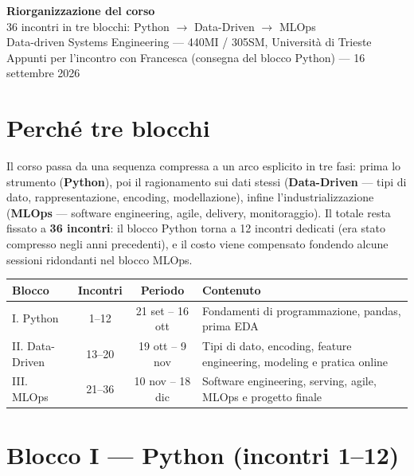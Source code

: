 \documentclass[11pt,a4paper]{article}
\begin{document}
\begin{center}
{\Huge\bfseries\color{courseblue} Riorganizzazione del corso}\\[4pt]
{\Large\color{coursegray} 36 incontri in tre blocchi: Python $\to$ Data-Driven $\to$ MLOps}\\[6pt]
{\small\color{coursegray} Data-driven Systems Engineering --- 440MI / 305SM, Università di Trieste}\\
{\small\color{coursegray} Appunti per l'incontro con Francesca (consegna del blocco Python) --- 16 settembre 2026}
\end{center}

\vspace{0.6em}

\section*{Perché tre blocchi}
Il corso passa da una sequenza compressa a un arco esplicito in tre fasi: prima lo strumento (\textbf{Python}), poi il ragionamento sui dati stessi (\textbf{Data-Driven} --- tipi di dato, rappresentazione, encoding, modellazione), infine l'industrializzazione (\textbf{MLOps} --- software engineering, agile, delivery, monitoraggio). Il totale resta fissato a \textbf{36 incontri}: il blocco Python torna a 12 incontri dedicati (era stato compresso negli anni precedenti), e il costo viene compensato fondendo alcune sessioni ridondanti nel blocco MLOps.

\vspace{0.3em}
\begin{center}
\begin{tabularx}{\textwidth}{@{}l c c X@{}}
\toprule
\textbf{Blocco} & \textbf{Incontri} & \textbf{Periodo} & \textbf{Contenuto} \\
\midrule
\rowcolor{tealsoft} I. Python & 1--12 & 21 set -- 16 ott & Fondamenti di programmazione, pandas, prima EDA \\
\rowcolor{courseice} II. Data-Driven & 13--20 & 19 ott -- 9 nov & Tipi di dato, encoding, feature engineering, modeling e pratica online \\
\rowcolor{plumsoft} III. MLOps & 21--36 & 10 nov -- 18 dic & Software engineering, serving, agile, MLOps e progetto finale \\
\bottomrule
\end{tabularx}
\end{center}

\section{Blocco I --- Python (incontri 1--12)}
\end{document}
